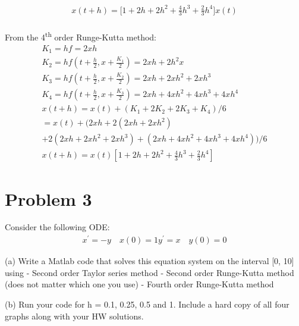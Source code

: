 \documentclass{article}
\newcommand{\ts}{\textsuperscript}
\begin{document}
\begin{align*}
	x(t + h) = \big[1 + 2h + 2h^{2} + \frac{4}{3}h^{3} + \frac{2}{3}h^{4} \big] x(t) \\
\end{align*}

From the 4\ts{th} order Runge-Kutta method:
\begin{align*}
	K_{1} = hf = 2xh \\
	K_{2} = hf(t + \frac{h}{2}, x + \frac{K_{1}}{2}) = 2xh + 2h^{2}x \\
	K_{3} = hf(t + \frac{h}{2}, x + \frac{K_{2}}{2}) = 2xh + 2xh^{2} + 2xh^{3} \\
	K_{4} = hf(t + \frac{h}{2}, x + \frac{K_{3}}{2}) = 2xh + 4xh^{2} + 4xh^{3} + 4xh^{4} \\
	x(t + h) = x(t) + (K_{1} + 2K_{2} + 2K_{3} + K_{4})/6 \\
	= x(t) + (2xh + 2(2xh + 2xh^{2}) \\ + 2(2xh + 2xh^{2} + 2xh^{3}) + (2xh + 4xh^{2} + 4xh^{3} + 4xh^{4}))/6 \\
	x(t + h) = x(t)[1 + 2h + 2h^{2} + \frac{4}{3}h^{3} + \frac{2}{3}h^{4}]
\end{align*}

\section*{Problem 3}
Consider the following ODE:
\begin{align*}
	x^{\prime} = -y \quad x(0) = 1
	y^{\prime} = x \quad y(0) = 0
\end{align*}

\noindent
(a) Write a Matlab code that solves this equation system on the interval [0, 10] using
- Second order Taylor series method
- Second order Runge-Kutta method (does not matter which one you use) - Fourth order Runge-Kutta method



(b) Run your code for h = 0.1, 0.25, 0.5 and 1. Include a hard copy of all four graphs along with your HW solutions.
\end{document}
